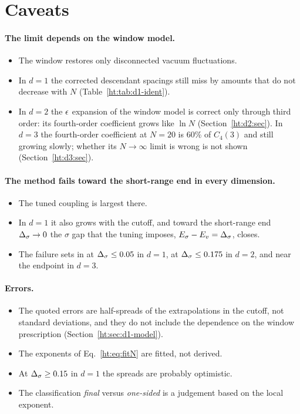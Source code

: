 \section{Caveats}\label{ht:sec:caveats}

\paragraph{The limit depends on the window model.}
\begin{itemize}
\item The window restores only disconnected vacuum fluctuations.
\item In $d=1$ the corrected descendant spacings still miss by amounts that do not decrease with $N$
 (Table~\ref{ht:tab:d1-ident}).
\item In $d=2$ the $\epsilon$ expansion of the window model is correct only through third order: its fourth-order
 coefficient grows like $\ln N$ (Section~\ref{ht:d2:sec}). In $d=3$ the fourth-order coefficient at $N=20$ is 60\% of
 $C_4(3)$ and still growing slowly; whether its $N\to\infty$ limit is wrong is not shown (Section~\ref{ht:d3:sec}).
\end{itemize}

\paragraph{The method fails toward the short-range end in every dimension.}
\begin{itemize}
\item The tuned coupling is largest there.
\item In $d=1$ it also grows with the cutoff, and toward the short-range end $\Delta_\sigma\to0$ the $\sigma$ gap that the
 tuning imposes, $E_\sigma-E_v=\Delta_\sigma$, closes.
\item The failure sets in at $\Delta_\sigma\le0.05$ in $d=1$, at $\Delta_\sigma\le0.175$ in $d=2$, and near the endpoint in $d=3$.
\end{itemize}

\paragraph{Errors.}
\begin{itemize}
\item The quoted errors are half-spreads of the extrapolations in the cutoff, not standard deviations, and they do
 not include the dependence on the window prescription (Section~\ref{ht:sec:d1-model}).
\item The exponents of Eq.~\eqref{ht:eq:fitN} are fitted, not derived.
\item At $\Delta_\sigma\ge0.15$ in $d=1$ the spreads are probably optimistic.
\item The classification \emph{final} versus \emph{one-sided} is a judgement based on the local exponent.
\end{itemize}

